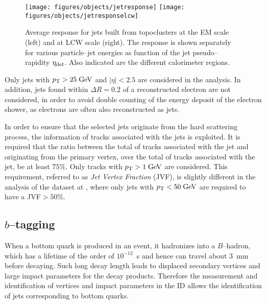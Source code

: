 \begin{figure}[htb!]\centering
  \texttt{[image: figures/objects/jetresponse]}
  \texttt{[image: figures/objects/jetresponselcw]}
  \caption{Average response for jets built from topoclusters at the EM scale (left)
    and at LCW scale (right). The response is shown separately for
    various particle--jet energies as function of the jet pseudo--rapidity
    $\eta_{\rm det}$. Also indicated are the different calorimeter regions.} 
  \label{fig:jetresponse}
\end{figure}

Only jets with $p_{\mathrm{T}}{}>25 \; \mathrm{GeV}{}$ and $|\eta|<2.5$ are considered in
the analysis. In addition, jets found within $\Delta R=0.2$ of a
reconstructed electron are not considered, in order to avoid double
counting of the energy deposit of the electron shower, as electrons
are often also reconstructed as jets.

In order to ensure that the selected jets originate from
the hard scattering process, the information of tracks associated with
the jets is exploited.
It is required that the ratio between the total \pt{} of tracks
associated with the jet and originating from the primary vertex, over the
total \pt{} of tracks associated with the jet, be at least
$75\%$. Only tracks with $p_{\mathrm{T}}{}>1 \; \mathrm{GeV}$ are considered.
This requirement, referred to as {\it Jet Vertex Fraction} (JVF), is
slightly different in the analysis of the dataset at \eighttev{},
where only jets with $p_{\mathrm{T}}{}<50 \; \mathrm{GeV}{}$ are required to have a
JVF$>50\%$. 

\subsection{$b$--tagging}
\label{sec:btag}

When a bottom quark is produced in an event, it hadronizes into a
$B$--hadron, which has a lifetime of the order of $10^{-12}$~s and
hence can travel about 3~mm before decaying.
Such long decay length leads to displaced secondary vertices and large
impact parameters for the decay products. Therefore the measurement
and identification of vertices and impact parameters in the ID allows the
identification of jets corresponding to bottom quarks.


